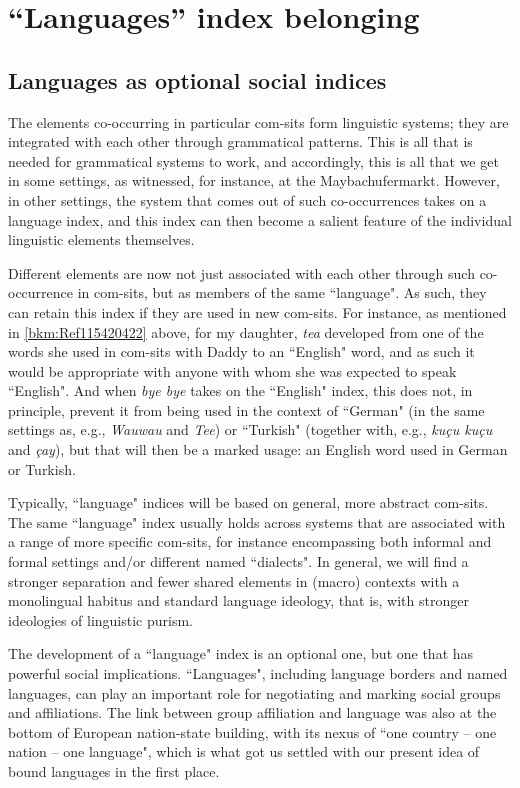 \chapter{“Languages'' index belonging}\label{chap:5}
\label{bkm:Ref113005745}\hypertarget{Toc125444663}{}\section{Languages as optional social indices}
\label{bkm:Ref121491384}\hypertarget{Toc125444664}{}
The elements co-occurring in particular com-sits form linguistic systems; they are integrated with each other through grammatical patterns. This is all that is needed for grammatical systems to work, and accordingly, this is all that we get in some settings, as witnessed, for instance, at the Maybachufermarkt. However, in other settings, the system that comes out of such co-occurrences takes on a language index, and this index can then become a salient feature of the individual linguistic elements themselves.

Different elements are now not just associated with each other through such co-occurrence in com-sits, but as members of the same “language". As such, they can retain this index if they are used in new com-sits. For instance, as mentioned in \ref{bkm:Ref115420422} above, for my daughter, \textit{tea} developed from one of the words she used in com-sits with Daddy to an “English" word, and as such it would be appropriate with anyone with whom she was expected to speak “English". And when \textit{bye bye} takes on the “English" index, this does not, in principle, prevent it from being used in the context of “German" (in the same settings as, e.g., \textit{Wauwau} and \textit{Tee}) or “Turkish" (together with, e.g., \textit{kuçu kuçu} and \textit{çay}), but that will then be a marked usage: an English word used in German or Turkish.

Typically, “language" indices will be based on general, more abstract com-sits. The same “language" index usually holds across systems that are associated with a range of more specific {{com-sits}}, for instance encompassing both informal and formal settings and/or different named “dialects". In general, we will find a stronger separation and fewer shared elements in (macro) contexts with a monolingual habitus and standard language ideology, that is, with stronger ideologies of linguistic purism.

The development of a “language" index is an optional one, but one that has powerful social implications. “Languages", including language borders and named languages, can play an important role for negotiating and marking social groups and affiliations. The link between group affiliation and language was also at the bottom of European nation-state building, with its nexus of “one country – one nation – one language", which is what got us settled with our present idea of bound languages in the first place.

